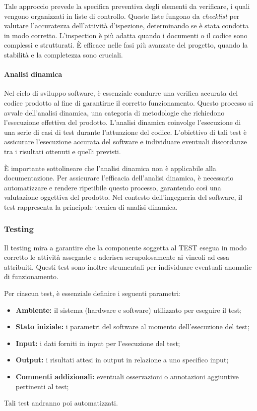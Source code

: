 Tale approccio prevede la specifica preventiva degli elementi da verificare, i quali vengono organizzati in liste di controllo.
Queste liste fungono da \textit{checklist} per valutare l'accuratezza dell'attività d'ispezione, determinando se è stata condotta in modo corretto.
L'inspection è più adatta quando i documenti o il codice sono complessi e strutturati. È efficace nelle fasi più avanzate del progetto, quando la stabilità e la completezza sono cruciali.

\paragraph{Analisi dinamica}
Nel ciclo di sviluppo software, è essenziale condurre una verifica accurata del codice prodotto al fine di garantirne il corretto funzionamento. Questo processo si avvale dell'analisi dinamica, una categoria di metodologie che richiedono l'esecuzione effettiva del prodotto.
L'analisi dinamica coinvolge l'esecuzione di una serie di casi di test durante l'attuazione del codice. L'obiettivo di tali test è assicurare l'esecuzione accurata del software e individuare eventuali discordanze tra i risultati ottenuti e quelli previsti.

È importante sottolineare che l'analisi dinamica non è applicabile alla documentazione.
Per assicurare l'efficacia dell'analisi dinamica, è necessario automatizzare e rendere ripetibile questo processo, garantendo così una valutazione oggettiva del prodotto. Nel contesto dell'ingegneria del software, il test rappresenta la principale tecnica di analisi dinamica.

\subsubsection{Testing}
Il testing mira a garantire che la componente soggetta al TEST esegua in modo corretto le attività assegnate e aderisca scrupolosamente ai vincoli ad essa attribuiti. Questi test sono inoltre strumentali per individuare eventuali anomalie di funzionamento.

Per ciascun test, è essenziale definire i seguenti parametri:

\begin{itemize}
    \item \textbf{Ambiente:} 
        il sistema (hardware e software) utilizzato per eseguire il test;
    \item \textbf{Stato iniziale:} 
        i parametri del software al momento dell'esecuzione del test;
    \item \textbf{Input:} 
        i dati forniti in input per l'esecuzione del test;
    \item \textbf{Output:} 
        i risultati attesi in output in relazione a uno specifico input;
    \item \textbf{Commenti addizionali:} 
        eventuali osservazioni o annotazioni aggiuntive pertinenti al test;
\end{itemize}
Tali test andranno poi automatizzati.

